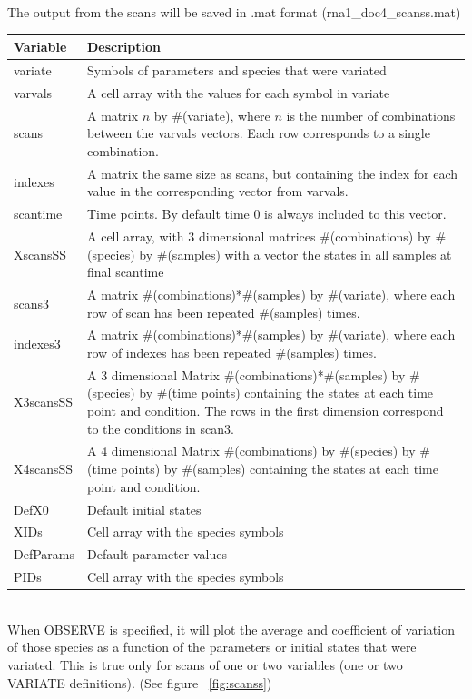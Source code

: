 \documentclass[letterpaper]{article}
\begin{document}
The output from the scans will be saved in \textsf{.mat} format
(\textsf{rna1\_doc4\_scanss.mat}) \\
\begin{tabular}{|p{1.5cm}|p{9cm}|} 
  \hline
  Variable & Description \\
  \hline
  variate & Symbols of parameters and species that were variated \\
  varvals & A cell array with the values for each symbol in variate \\
  scans & A matrix $n$ by \#(variate), where $n$ is the number of
  combinations between the varvals vectors. Each row corresponds to a
  single combination. \\
  indexes & A matrix the same size as scans, but containing the index
  for each value in the corresponding vector from varvals.\\
  scantime & Time points. By default time 0 is always included to this
  vector. \\
  XscansSS & A cell array, with 3 dimensional matrices
  \#(combinations) by \#(species) by \#(samples) with a vector the
  states in all samples at final scantime \\
  scans3 & A matrix \#(combinations)*\#(samples) by \#(variate), where
  each row of scan has been repeated \#(samples) times.\\
  indexes3 & A matrix \#(combinations)*\#(samples) by \#(variate),
  where each row of indexes has been repeated \#(samples) times.\\
  X3scansSS & A 3 dimensional Matrix \#(combinations)*\#(samples) by
  \#(species) by \#(time points) containing the states at each time
  point and condition. The rows in the first dimension correspond to
  the conditions in scan3. \\
  X4scansSS & A 4 dimensional Matrix \#(combinations) by \#(species)
  by \#(time points) by \#(samples) containing the states at each time
  point and condition. \\
  DefX0 & Default initial states \\
  XIDs & Cell array with the species symbols \\
  DefParams & Default parameter values \\
  PIDs & Cell array with the species symbols \\
  \hline
\end{tabular}\\ 

When OBSERVE is specified, it will plot the average and coefficient of
variation of those species as a function of the parameters or initial
states that were variated. This is true only for scans of one or two
variables (one or two VARIATE definitions). (See figure
~\ref{fig:scanss})
\end{document}
